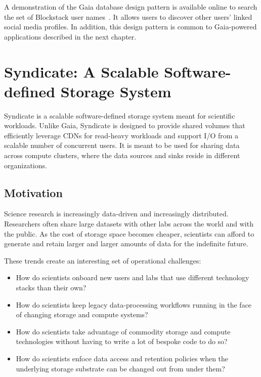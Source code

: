 A demonstration of the Gaia database design pattern is available online to search the
set of Blockstack user names~\cite{blockstack-explorer}.  It allows users to
discover other users' linked social media profiles.  In addition, this design
pattern is common to Gaia-powered applications described in the next chapter.

\section{Syndicate: A Scalable Software-defined Storage System}

Syndicate is a scalable software-defined storage system meant for scientific
workloads.  Unlike Gaia, Syndicate is designed to provide shared volumes that
efficiently leverage CDNs for read-heavy workloads and 
support I/O from a scalable number of concurrent users.  It is meant to be
used for sharing data across compute clusters, where the data sources and
sinks reside in different organizations.

\subsection{Motivation}

Science research is increasingly data-driven and increasingly distributed.
Researchers often share large datasets with other labs across the world and 
with the public.  As the cost of storage space becomes cheaper, scientists can
afford to generate and retain larger and larger amounts of data for the
indefinite future.

These trends create an interesting set of operational challenges:

\begin{itemize}
   \item How do scientists onboard new users and labs that use different
      technology stacks than their own?
   \item How do scientists keep legacy data-processing workflows running in the face
      of changing storage and compute systems?
   \item How do scientists take advantage of commodity storage and
      compute technologies without having to write a lot of bespoke code
      to do so?
   \item How do scientists enfoce data access and retention policies when the
      underlying storage substrate can be changed out from under them?
\end{itemize}

